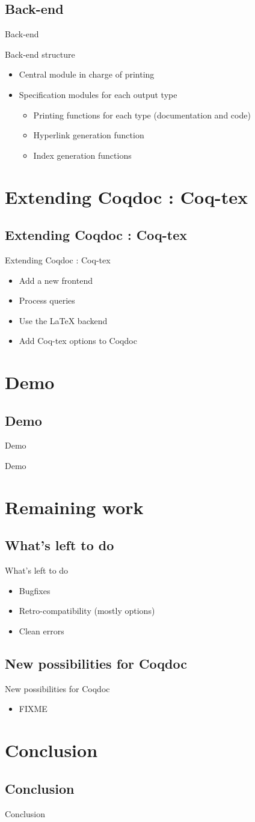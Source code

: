 \documentclass[compress]{beamer}
\newenvironment{tframe}[1]{
  \subsection{#1}
  \begin{frame}{#1}
  }{
  \end{frame}
  }
\begin{document}
  \begin{tframe}{Back-end}
    Back-end structure
    \begin{itemize}
      \item Central module in charge of printing
      \item Specification modules for each output type
        \begin{itemize}
          \item Printing functions for each type (documentation and code)
          \item Hyperlink generation function
          \item Index generation functions
        \end{itemize}
    \end{itemize}
  \end{tframe}

\section{Extending Coqdoc : Coq-tex}
  \begin{tframe}{Extending Coqdoc : Coq-tex}
    \begin{itemize}[<+->]
      \item Add a new frontend
      \item Process queries
      \item Use the LaTeX backend
      \item Add Coq-tex options to Coqdoc
    \end{itemize}
  \end{tframe}

\section{Demo}
  \begin{tframe}{Demo}
    \begin{center}
      Demo
    \end{center}
  \end{tframe}

\section{Remaining work}
  \begin{tframe}{What's left to do}
    \begin{itemize}
      \item Bugfixes
      \item Retro-compatibility (mostly options)
      \item Clean errors
    \end{itemize}
  \end{tframe}
  \begin{tframe}{New possibilities for Coqdoc}
    \begin{itemize}
      \item FIXME
    \end{itemize}
  \end{tframe}

\section{Conclusion}
  \begin{tframe}{Conclusion}
  \end{tframe}
\end{document}
